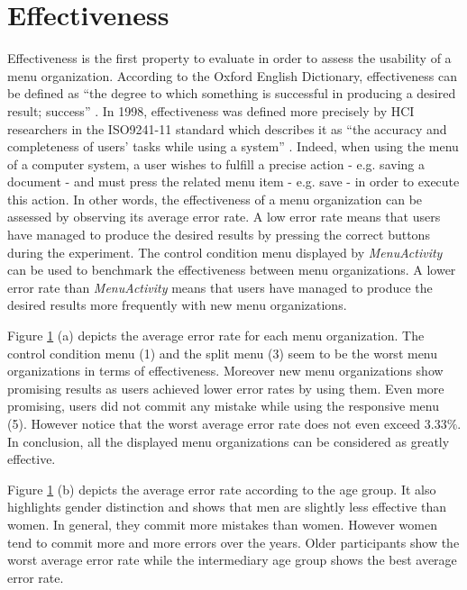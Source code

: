 \section{Effectiveness}
Effectiveness is the first property to evaluate in order to assess the 
usability of a menu organization. According to the Oxford English Dictionary, 
effectiveness can be defined as \enquote{the degree to which something is 
successful in producing a desired result; success} \cite{effectiveness}. In 
1998, effectiveness was defined more precisely by HCI researchers in 
the ISO9241-11 standard which describes it as \enquote{the accuracy and 
completeness of users' 
tasks while using a system} \cite{iso}. Indeed, when using the 
menu of a computer system, a user wishes to fulfill a precise action - e.g. 
saving a document - and must press the related menu item - e.g. save - in order 
to execute this action. In other words, the effectiveness of a menu 
organization can be assessed by observing its average error rate. A low error 
rate means that users have managed to produce the desired results by pressing 
the correct buttons during the experiment. The control condition menu 
displayed 
by \textit{MenuActivity} can be used to benchmark the effectiveness between 
menu organizations. A lower error rate than \textit{MenuActivity} means that 
users have managed to produce the desired results more frequently with new menu 
organizations.\newline

Figure \ref{fig:errors} (a) depicts the average error rate for each 
menu organization. The control condition menu (1) and the split menu (3) seem 
to be the worst menu organizations in terms of effectiveness. Moreover new menu 
organizations show promising results as users achieved lower error rates 
by using them. Even more promising, users did not commit any mistake while 
using the responsive menu (5). However notice that the worst 
average error rate does not even exceed $3.33\%$. In conclusion, all 
the displayed menu organizations can be considered as greatly effective.

\begin{figure}[!ht]
    
    \label{fig:errors}
\end{figure}

Figure \ref{fig:errors} (b) depicts the average error rate according to 
the age group. It also highlights gender distinction and shows that men are 
slightly less effective than women. In general, they commit more mistakes than 
women. However women tend to commit more and more errors over the years. Older 
participants show the worst average error rate while the intermediary age group 
shows the best average error rate.


